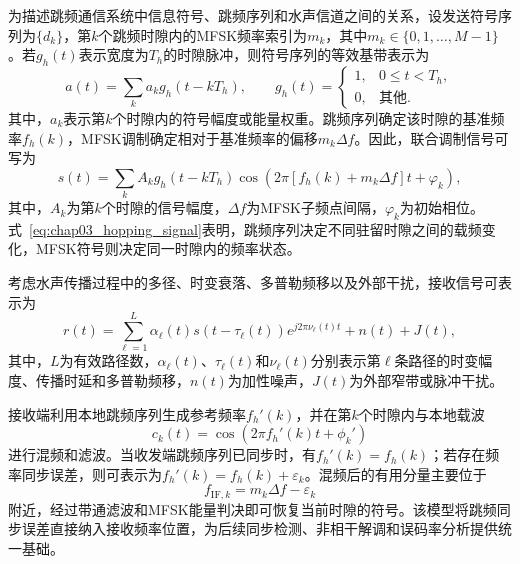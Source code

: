 为描述跳频通信系统中信息符号、跳频序列和水声信道之间的关系，设发送符号序列为$\{d_k\}$，第$k$个跳频时隙内的MFSK频率索引为$m_k$，其中$m_k\in\{0,1,\ldots,M-1\}$。若$g_h(t)$表示宽度为$T_h$的时隙脉冲，则符号序列的等效基带表示为
\begin{equation}
 a(t)=\sum_{k}a_k g_h(t-kT_h),
 \qquad
 g_h(t)=
 \begin{cases}
 1, & 0\leq t<T_h,\\
 0, & \text{其他}.
 \end{cases}
\label{eq:chap03_baseband}
\end{equation}
其中，$a_k$表示第$k$个时隙内的符号幅度或能量权重。跳频序列确定该时隙的基准频率$f_h(k)$，MFSK调制确定相对于基准频率的偏移$m_k\Delta f$。因此，联合调制信号可写为
\begin{equation}
 s(t)=\sum_{k} A_k g_h(t-kT_h)
 \cos\!\left(2\pi\left[f_h(k)+m_k\Delta f\right]t+\varphi_k\right),
\label{eq:chap03_hopping_signal}
\end{equation}
其中，$A_k$为第$k$个时隙的信号幅度，$\Delta f$为MFSK子频点间隔，$\varphi_k$为初始相位。式~\eqref{eq:chap03_hopping_signal}表明，跳频序列决定不同驻留时隙之间的载频变化，MFSK符号则决定同一时隙内的频率状态。

考虑水声传播过程中的多径、时变衰落、多普勒频移以及外部干扰，接收信号可表示为
\begin{equation}
 r(t)=\sum_{\ell=1}^{L}\alpha_{\ell}(t)
 s\!\left(t-\tau_{\ell}(t)\right)
 e^{j2\pi\nu_{\ell}(t)t}
 +n(t)+J(t),
\label{eq:chap03_hopping_channel}
\end{equation}
其中，$L$为有效路径数，$\alpha_{\ell}(t)$、$\tau_{\ell}(t)$和$\nu_{\ell}(t)$分别表示第$\ell$条路径的时变幅度、传播时延和多普勒频移，$n(t)$为加性噪声，$J(t)$为外部窄带或脉冲干扰。

接收端利用本地跳频序列生成参考频率$f_h'(k)$，并在第$k$个时隙内与本地载波
\begin{equation}
 c_k(t)=\cos\!\left(2\pi f_h'(k)t+\phi_k'\right)
\label{eq:chap03_local_carrier}
\end{equation}
进行混频和滤波。当收发端跳频序列已同步时，有$f_h'(k)=f_h(k)$；若存在频率同步误差，则可表示为$f_h'(k)=f_h(k)+\varepsilon_k$。混频后的有用分量主要位于
\begin{equation}
 f_{\mathrm{IF},k}=m_k\Delta f-\varepsilon_k
\label{eq:chap03_intermediate_frequency}
\end{equation}
附近，经过带通滤波和MFSK能量判决即可恢复当前时隙的符号。该模型将跳频同步误差直接纳入接收频率位置，为后续同步检测、非相干解调和误码率分析提供统一基础。

